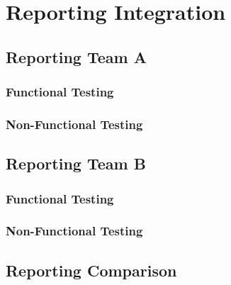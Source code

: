 \documentclass[12pt, oneside]{article}
\begin{document}
\newpage 
\section{Reporting Integration}
	\subsection{Reporting Team A}	
		\subsubsection{Functional Testing}
			
		\subsubsection{Non-Functional Testing }
			
	
	\subsection{Reporting Team B}	
		\subsubsection{Functional Testing}
			
		\subsubsection{Non-Functional Testing }
			
	
	\subsection{Reporting Comparison}
\end{document}
